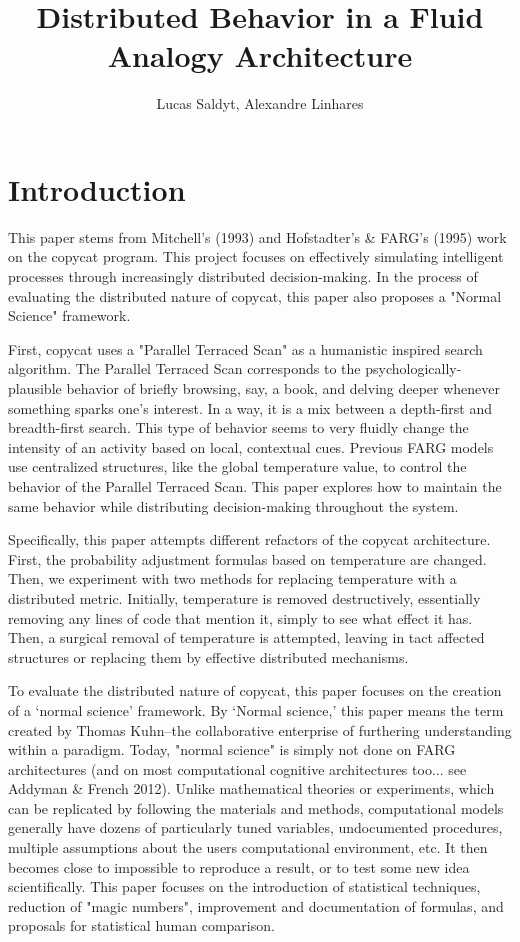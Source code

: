 \documentclass[a4paper]{article}
\title{Distributed Behavior in a Fluid Analogy Architecture}
\author{Lucas Saldyt, Alexandre Linhares}
\begin{document}
\maketitle

\begin{abstract}
\end{abstract}

\section{Introduction}

    This paper stems from Mitchell's (1993) and Hofstadter's \& FARG's (1995) work on the copycat program. 
    This project focuses on effectively simulating intelligent processes through increasingly distributed decision-making.
    In the process of evaluating the distributed nature of copycat, this paper also proposes a "Normal Science" framework. 

    First, copycat uses a "Parallel Terraced Scan" as a humanistic inspired search algorithm.
    The Parallel Terraced Scan corresponds to the psychologically-plausible behavior of briefly browsing, say, a book, and delving deeper whenever something sparks one's interest. 
    In a way, it is a mix between a depth-first and breadth-first search.
    This type of behavior seems to very fluidly change the intensity of an activity based on local, contextual cues. 
    Previous FARG models use centralized structures, like the global temperature value, to control the behavior of the Parallel Terraced Scan.
    This paper explores how to maintain the same behavior while distributing decision-making throughout the system.

    Specifically, this paper attempts different refactors of the copycat architecture.
    First, the probability adjustment formulas based on temperature are changed.
    Then, we experiment with two methods for replacing temperature with a distributed metric.
    Initially, temperature is removed destructively, essentially removing any lines of code that mention it, simply to see what effect it has.
    Then, a surgical removal of temperature is attempted, leaving in tact affected structures or replacing them by effective distributed mechanisms.

    To evaluate the distributed nature of copycat, this paper focuses on the creation of a `normal science' framework.
    By `Normal science,' this paper means the term created by Thomas Kuhn--the collaborative enterprise of furthering understanding within a paradigm. 
    Today, "normal science" is simply not done on FARG architectures (and on most computational cognitive architectures too... see Addyman \& French 2012). 
    Unlike mathematical theories or experiments, which can be replicated by following the materials and methods, computational models generally have dozens of particularly tuned variables, undocumented procedures, multiple assumptions about the users computational environment, etc.
    It then becomes close to impossible to reproduce a result, or to test some new idea scientifically. 
    This paper focuses on the introduction of statistical techniques, reduction of "magic numbers", improvement and documentation of formulas, and proposals for statistical human comparison.
\end{document}
